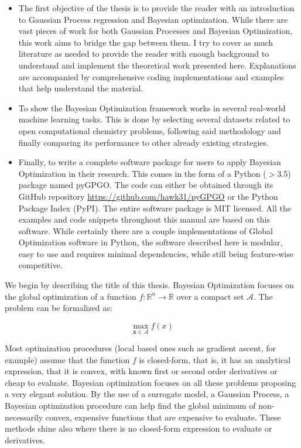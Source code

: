 \documentclass[10pt,a4paper,twoside]{book}
\begin{document}
\begin{itemize}
\item The first objective of the thesis is to provide the reader with an introduction to Gaussian Process regression and Bayesian optimization. While there are vast pieces of work for both Gaussian Processes and Bayesian Optimization, this work aims to bridge the gap between them. I try to cover as much literature as needed to provide the reader with enough background to understand and implement the theoretical work presented here. Explanations are accompanied by comprehensive coding implementations and examples that help understand the material.
\item To show the Bayesian Optimization framework works in several real-world machine learning tasks. This is done by selecting several datasets related to open computational chemistry problems, following said methodology and finally comparing its performance to other already existing strategies. 
\item Finally, to write a complete software package for users to apply Bayesian Optimization in their research. This comes in the form of a Python ($>$3.5) package named pyGPGO. The code can either be obtained through its GitHub repository \url{https://github.com/hawk31/pyGPGO} or the Python Package Index (PyPI). The entire software package is MIT licensed. All the examples and code snippets throughout this manual are based on this software. While certainly there are a couple implementations of Global Optimization software in Python, the software described here is modular, easy to use and requires minimal dependencies, while still being feature-wise competitive.
\end{itemize}

We begin by describing the title of this thesis. Bayesian Optimization focuses on the global optimization of a function $f:\mathbb{R}^n \rightarrow \mathbb{R}$ over a compact set $\mathcal{A}$. The problem can be formalized as:

\begin{equation}
\max_{\boldsymbol{x}\in \mathcal{A}} f(x)
\end{equation}

Most optimization procedures (local based ones such as gradient ascent, for example) assume that the function $f$ is closed-form, that is, it has an analytical expression, that it is convex, with known first or second order derivatives or cheap to evaluate. Bayesian optimization focuses on all these problems proposing a very elegant solution. By the use of a surrogate model, a Gaussian Process, a Bayesian optimization procedure can help find the global minimum of non-necessarily convex, expensive functions that are expensive to evaluate. These methods shine also where there is no closed-form expression to evaluate or derivatives.\\
\end{document}
